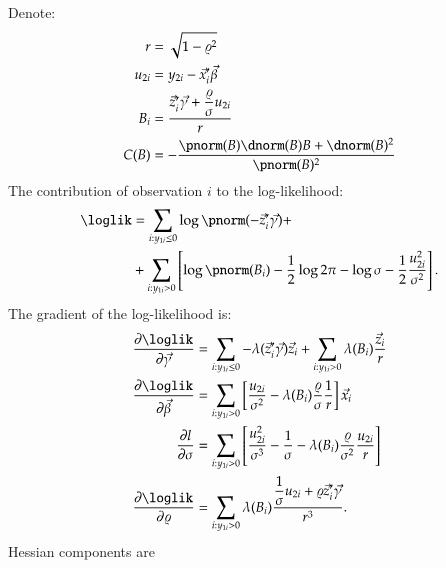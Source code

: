 \documentclass[a4paper]{article}
\numberwithin{equation}{subsection}
\begin{document}
Denote:
\begin{align}
  r &=
  \sqrt{1 - \varrho^2}
  \\
  u_{2i} &= y_{2i} - \vec{x}_i'\vec{\beta}
  \\
  B_i &= 
  \frac{\vec{z}_i' \vec{\gamma} +
    \displaystyle \frac{\varrho}{\sigma} u_{2i}} {r}
  \\
  C(B) &= -\frac{\pnorm(B) \dnorm(B) B + \dnorm(B)^2}{\pnorm(B)^2}
\end{align}
The contribution of observation $i$ to the log-likelihood:
\begin{align}
  \loglik & = 
  \sum_{i:y_{1i} \le 0} 
  \log \pnorm(-\vec{z}_i' \vec{\gamma}) +
  \\
  & +
  \sum_{i:y_{1i} > 0} \left[
    \log \pnorm (B_i) 
    -\frac{1}{2} \log 2\pi - \log \sigma -
    \frac{1}{2} \frac{u_{2i}^2}{\sigma^2} \right].
\end{align}
The gradient of the log-likelihood is:
\begin{align}
  \frac{\partial \loglik}{\partial \vec{\gamma}} 
  & = 
  \sum_{i:y_{1i} \le 0} 
  -\lambda(\vec{z}_i' \vec{\gamma}) \vec{z}_i
  +
  \sum_{i:y_{1i} > 0} 
  \lambda(B_i) \frac{\vec{z}_i}{r} \\
  \frac{\partial \loglik}{\partial \vec{\beta}} 
  & = 
  \sum_{i:y_{1i} > 0} \left[
    \frac{u_{2i}}{ \sigma^2} -
    \lambda(B_i)
    \frac{\varrho}{\sigma} \frac{1}{r} 
  \right]
  \vec{x}_i
  \\
  \frac{\partial l}{\partial \sigma} 
  & = 
  \sum_{i:y_{1i} > 0} 
  \left[
    \frac{ u_{2i}^2}{\sigma^3} -
    \frac{1}{\sigma} -
    \lambda(B_i) \frac{\varrho}{\sigma^2} 
    \frac{u_{2i}}{r} 
  \right]
  \\
  \frac{\partial \loglik}{\partial \varrho} 
  & = 
  \sum_{i:y_{1i} > 0} 
  \lambda(B_i)
  \frac{ \displaystyle \frac{1}{\sigma}
    u_{2i} + \varrho \vec{z}_i' \vec{\gamma}}
  {r^3}.
\end{align}
Hessian components are
\end{document}
